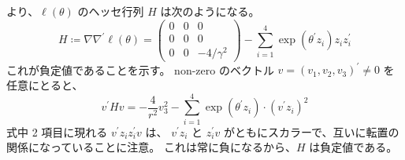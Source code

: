 \documentclass[./main.tex]{subfiles}
\begin{document}
\begin{enumerate}
\begin{enumerate}
\begin{equation*}
            \end{equation*}
            より、$\ell (\theta)$ のヘッセ行列 $H$ は次のようになる。
            \begin{equation*}
                H \coloneq \nabla \nabla^\prime \ell (\theta) =
                \begin{pmatrix}
                    0 & 0 & 0\\
                    0 & 0 & 0\\
                    0 & 0 & -4 / \gamma^2
                \end{pmatrix}
                - \sum_{i=1}^{4} \exp(\theta^\prime z_i) z_i z_i^\prime
            \end{equation*}
            これが負定値であることを示す。
            non-zero のベクトル $v = (v_1, v_2, v_3)^\prime \neq 0$ を任意にとると、
            \begin{equation*}
                v^\prime H v
                    = - \frac{4}{r^2} v_3^2
                        - \sum_{i=1}^4 \exp (\theta^\prime z_i) \cdot (v^\prime z_i)^2
            \end{equation*}
            式中 2 項目に現れる $v^\prime z_i z_i^\prime v$ は、
            $v^\prime z_i$ と $z_i^\prime v$ がともにスカラーで、互いに転置の関係になっていることに注意。
            これは常に負になるから、$H$ は負定値である。
        \end{enumerate}
    \end{enumerate}
\end{document}
